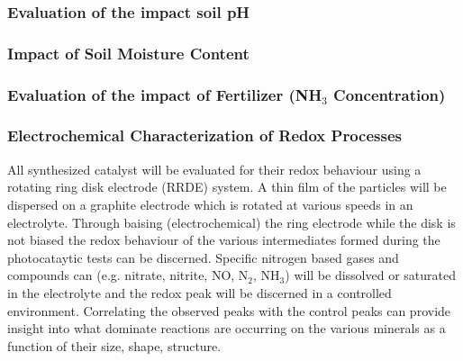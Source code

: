 \vspace{1mm}
\subsubsection{Evaluation of the impact soil pH}
\vspace{1mm}


\vspace{1mm}
\subsubsection{Impact of Soil Moisture Content}
\vspace{1mm}

\vspace{1mm}
\subsubsection{Evaluation of the impact of Fertilizer (NH$_3$ Concentration)}
\vspace{1mm}


\vspace{1mm}
\subsubsection{Electrochemical Characterization of Redox Processes}
All synthesized catalyst will be evaluated for their redox behaviour using a rotating ring disk electrode (RRDE) system. A thin film of the particles will be dispersed on a graphite electrode which is rotated at various speeds in an electrolyte. Through baising (electrochemical) the ring electrode while the disk is not biased the redox behaviour of the various intermediates formed during the photocataytic tests can be discerned. Specific nitrogen based gases and compounds can  (e.g. nitrate, nitrite, NO, N$_2$, NH$_3$) will be dissolved or saturated in the electrolyte and the redox peak will be discerned in a controlled environment. Correlating the observed peaks with the control peaks can provide insight into what dominate reactions are occurring on the various minerals as a function of their size, shape, structure. 


